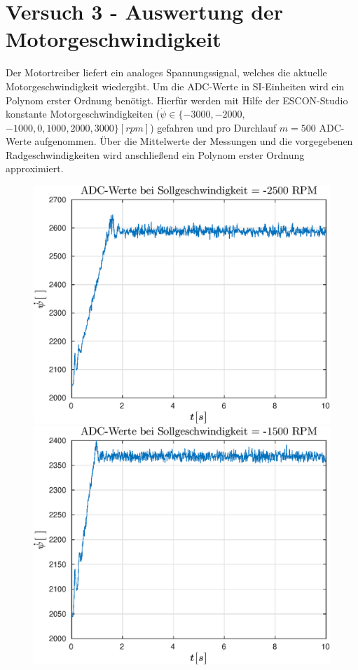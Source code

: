 \section{Versuch 3 - Auswertung der Motorgeschwindigkeit}
Der Motortreiber liefert ein analoges Spannungssignal, welches die aktuelle Motorgeschwindigkeit wiedergibt. Um die ADC-Werte in SI-Einheiten wird ein Polynom erster Ordnung benötigt. Hierfür werden mit Hilfe der ESCON-Studio konstante Motorgeschwindigkeiten ($\dot{\psi} \in \{ -3000, -2000,$  $-1000, 0, 1000, 2000, 3000 \} [rpm] $) gefahren und pro Durchlauf $m=500$ ADC-Werte aufgenommen. Über die Mittelwerte der Messungen und die vorgegebenen Radgeschwindigkeiten wird anschließend ein Polynom erster Ordnung approximiert.

\begin{figure}[h]
	\includegraphics[width=0.5\linewidth]{img/psi1__d___rpm_-2500.eps}
	\includegraphics[width=0.5\linewidth]{img/psi1__d___rpm_-1500.eps}
\end{figure}
